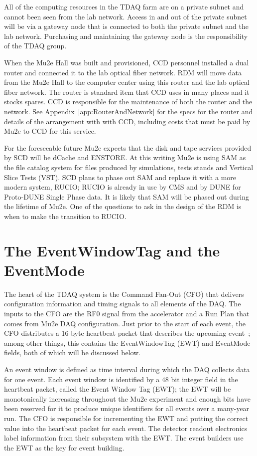 All of the computing resources in the TDAQ farm are on a private subnet
and cannot been seen from the lab network.  Access in and out
of the private subnet will be via a gateway node that is connected to
both the private subnet and the lab network.
Purchasing and maintaining the gateway node is the responsibility of the TDAQ group.

When the Mu2e Hall was built and provisioned, CCD personnel installed a dual router
and connected it to the lab optical fiber network.
RDM will move data from the Mu2e Hall
to the computer center using this router and the lab optical fiber network.
The router is standard item that CCD uses in many places and it stocks spares.
CCD is responsible for the maintenance of both the router and the network.
See Appendix~\ref{app:RouterAndNetwork} for the
specs for the router and details of the arrangement with with CCD,
including costs that must be paid by Mu2e to CCD for this service.


For the foreseeable future Mu2e expects that the disk and tape services provided
by SCD will be dCache and ENSTORE.
At this writing Mu2e is using SAM as the file catalog system for files produced
by simulations, tests stands and Vertical Slice Tests (VST).
SCD plans to phase out SAM and replace it with a more modern system, RUCIO\cite{RUCIOHome};
RUCIO is already in use by CMS and by DUNE for Proto-DUNE Single Phase data.
It is likely that SAM will be phased out during the lifetime of Mu2e.
One of the questions to ask in the design of the RDM is
when to make the transition to RUCIO.

\section{The EventWindowTag and the EventMode}
\label{sec:EWTagAndEventMode}

The heart of the TDAQ system is the Command Fan-Out (CFO) that delivers
configuration information and timing signals to all elements of the DAQ.
The inputs to the CFO are the RF0 signal from the accelerator
and a Run Plan that comes from Mu2e DAQ configuration.
Just prior to the start of each event,
the CFO distributes a 16-byte heartbeat packet that describes the upcoming event~\cite{PacketProtocols};
among other things, this contains the EventWindowTag (EWT) and EventMode fields,
both of which will be discussed below.

An event window is defined as time interval during which the DAQ collects data for one event.
Each event window is identified by a 48 bit integer field in the heartbeat packet, called
the Event Window Tag (EWT);
the EWT will be monotonically increasing throughout the Mu2e experiment and
enough bits have been reserved for it to produce unique identifiers for all
events over a many-year run.
The CFO is responsible for incrementing the EWT and putting the correct value into
the heartbeat packet for each event.
The detector readout electronics label information from their subsystem with the EWT.
The event builders use the EWT as the key for event building.


